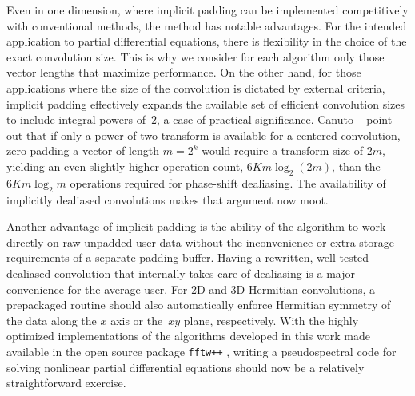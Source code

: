 \documentclass[final]{siamltex}
\begin{document}
Even in one dimension, where implicit padding can be implemented
competitively with conventional methods, the method has notable advantages.
For the intended application to partial differential
equations, there is flexibility in the choice of the exact convolution
size. This is why we consider for each algorithm only those vector lengths
that maximize performance.
On the other hand, for those applications where the size of the convolution
is dictated by external criteria, implicit padding effectively expands the
available set of efficient convolution sizes to include integral powers
of~$2$, a case of practical significance.
Canuto \etal\ \cite[p.136]{Canuto06} point out that if only a
power-of-two transform is available for a centered convolution, zero
padding a vector of length $m=2^k$  would require a transform size of $2m$,
yielding an even slightly higher operation count, $6Km\log_2(2m)$, than the $6K
m\log_2m$ operations required for phase-shift dealiasing. The availability
of implicitly dealiased convolutions makes that argument now moot.

Another advantage of implicit padding is the ability of the algorithm to
work directly on raw unpadded user data without the inconvenience or extra
storage requirements of a separate padding buffer. 
Having a rewritten, well-tested dealiased convolution that internally
takes care of dealiasing is a major convenience for the average user.
For 2D and 3D Hermitian convolutions, a prepackaged routine should also
automatically enforce Hermitian symmetry of the data along the $x$ axis or
the~$xy$ plane, respectively. With the highly optimized implementations of
the algorithms developed in this work made available in the open source
package {\tt fftw++} \cite{fftwpp}, writing a pseudospectral code for
solving nonlinear partial differential equations should now be a relatively
straightforward exercise.



\end{document}
